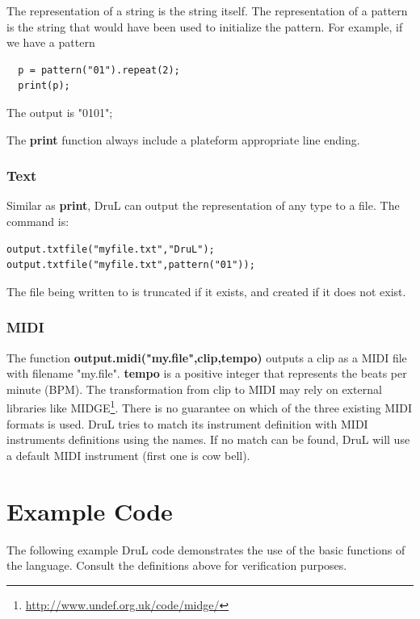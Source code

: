 The representation of a string is the string itself. The representation
of a pattern is the string that would have been used to initialize
the pattern. For example, if we have a pattern
\begin{verbatim}
  p = pattern("01").repeat(2);
  print(p);
\end{verbatim}
The output is "0101";

The \textbf{print} function always include a plateform appropriate line
ending.

\subsubsection{Text}

Similar as \textbf{print}, DruL can output the representation of any type 
to a file. The command is:
\begin{verbatim}
output.txtfile("myfile.txt","DruL");
output.txtfile("myfile.txt",pattern("01"));
\end{verbatim}

The file being written to is truncated if it exists, and created if it does not exist.

\subsubsection{MIDI}

The function \textbf{output.midi("my.file",clip,tempo)} outputs a clip as a MIDI
file with filename "my.file". \textbf{tempo} is a positive integer that
represents the beats per minute (BPM). 
The transformation from clip to MIDI may rely
on external libraries like MIDGE\footnote{\url{http://www.undef.org.uk/code/midge/}}. There is no guarantee on which of the three existing MIDI formats is used.
DruL tries to match its instrument definition with MIDI instruments definitions
using the names. If no match can be found, DruL will use a default MIDI instrument (first one is cow bell).




\clearpage

\section{Example Code}

The following example DruL code demonstrates the use of the basic functions of the language.
Consult the definitions above for verification purposes.

